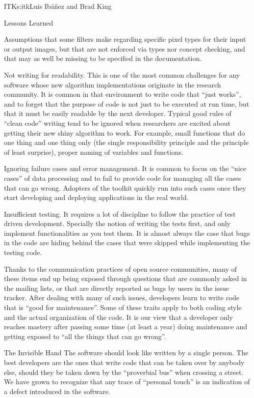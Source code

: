 \begin{aosachapter}{ITK}{s:itk}{Luis Ib\'{a}\~{n}ez and Brad King}
\begin{aosasect1}{Lessons Learned}
\begin{aosaitemize}
\item Assumptions that some filters make regarding specific pixel types for
their input or output images, but that are not enforced via types nor concept
checking, and that may as well be missing to be specified in the documentation.
\item Not writing for readability. This is one of the most common
challenges for any software whose new algorithm implementations originate in
the research community. It is common in that environment to write code that
``just works'', and to forget that the purpose of code is not just to be
executed at run time, but that it must be easily readable by the next
developer. Typical good rules of ``clean code'' writing tend to be ignored when
researchers are excited about getting their new shiny algorithm to work. For
example, small functions that do one thing and one thing only (the single
responsibility principle and the principle of least surprise), proper naming of
variables and functions.
\item Ignoring failure cases and error management. It is common to
focus on the ``nice cases'' of data processing and to fail to provide code for
managing all the cases that can go wrong. Adopters of the toolkit
quickly run into such cases once they start developing and deploying
applications in the real world.
\item Insufficient testing. It requires a lot of discipline to follow the
practice of test driven development. Specially the notion of writing the tests
first, and only implement functionalities as you test them. It is almost always
the case that bugs in the code are hiding behind the cases that were skipped
while implementing the testing code.
\end{aosaitemize}

Thanks to the communication practices of open source communities, many of these
items end up being exposed through questions that are commonly asked in the
mailing lists, or that are directly reported as bugs by users  in the issue
tracker. After dealing with many of such issues, developers learn to write code
that is ``good for maintenance''. Some of these traits apply to both coding
style and the actual organization of the code. It is our view that a developer
only reaches mastery after passing some time (at least a year) doing maintenance
and getting exposed to ``all the things that can go wrong''.

\begin{aosasect2}{The Invisible Hand}
The software should look like written by a single person. The best developers
are the ones that write code that can be taken over by anybody else, should
they be taken down by the ``proverbial bus'' when crossing a street. We have
grown to recognize that any trace of ``personal touch'' is an indication of a
defect introduced in the software.


\end{aosasect2}
\end{aosasect1}
\end{aosachapter}

